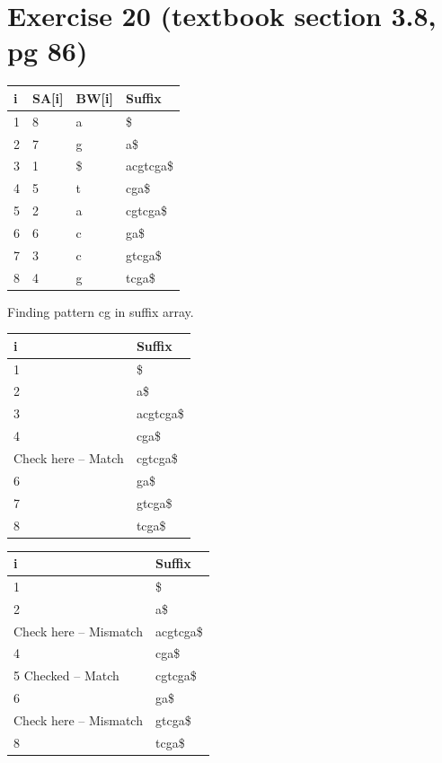 \documentclass{article}
\begin{document}
\section{Exercise 20 (textbook section 3.8, pg 86)}
\bgroup
\def\arraystretch{1.5}%
\begin{tabularx}{8cm}{| X | X | X | X |}
  \hline
  \textbf{i} & \textbf{SA[i]} & \textbf{BW[i]} & \textbf{Suffix}\\
  \hline
  1 & 8 & a  & \$		\\
  2 & 7 & g  & a\$		\\
  3 & 1 & \$ & acgtcga\$\\
  4 & 5 & t  & cga\$	\\ 
  5 & 2 & a  & cgtcga\$ \\
  6 & 6 & c  & ga\$		\\
  7 & 3 & c  & gtcga\$	\\
  8 & 4 & g  & tcga\$	\\
  \hline
\end{tabularx}
\egroup

\vspace{.5cm}

Finding pattern cg in suffix array.

\bgroup
\def\arraystretch{1.5}%
\begin{tabularx}{8cm}{| X | X |}
  \hline
  \textbf{i} & \textbf{Suffix}\\
  \hline
  1 & \$		\\
  2 & a\$		\\
  3 & acgtcga\$ \\
  4 & cga\$		\\ 
  Check here -- Match & cgtcga\$ \\
  6 & ga\$		\\
  7 & gtcga\$	\\
  8 & tcga\$	\\
  \hline
\end{tabularx}
\egroup

\vspace{.5cm}

\bgroup
\def\arraystretch{1.5}%
\begin{tabularx}{8cm}{| X | X |}
  \hline
  \textbf{i} & \textbf{Suffix}\\
  \hline
  1 & \$		\\
  2 & a\$		\\
  Check here -- Mismatch & acgtcga\$ \\
  4 & cga\$		\\ 
  5 Checked -- Match & cgtcga\$ \\
  6 & ga\$		\\
  Check here -- Mismatch & gtcga\$	\\
  8 & tcga\$	\\
  \hline
\end{tabularx}
\egroup
\end{document}
